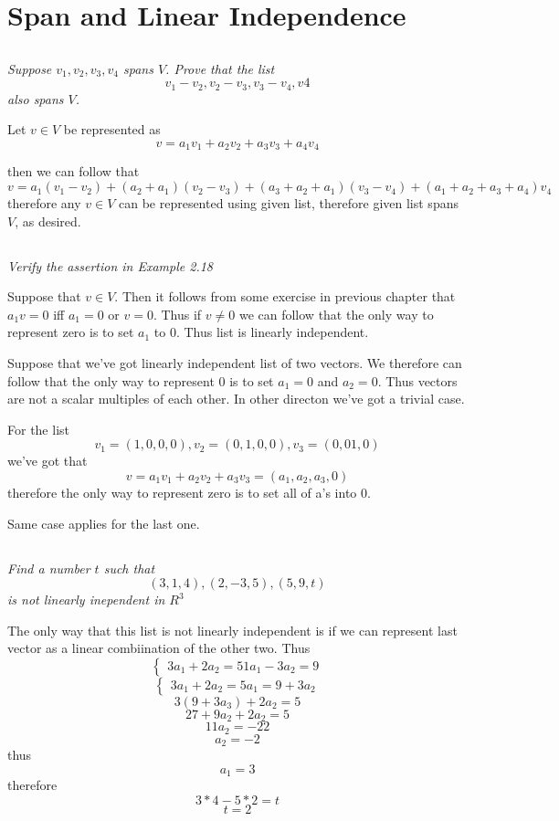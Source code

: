\documentclass[11pt,oneside,titlepage]{book}
\begin{document}
\section{Span and Linear Independence}

\subsection{}
\textit{Suppose $v_1, v_2, v_3, v_4$ spans $V$. Prove that the list }
$$v_1 - v_2, v_2 - v_3, v_3 - v_4, v4$$
\textit{also spans $V$.}

Let $v \in V$ be represented as
$$v = a_1 v_1 + a_2 v_2 + a_3 v_3 + a_4 v_4$$

then we can follow that
$$v = a_1 (v_1 - v_2) + (a_2 + a_1) (v_2 - v_3)+ (a_3 + a_2 + a_1) (v_3 - v_4) + (a_1 + a_2 + a_3 + a_4) v_4$$
therefore any $v \in V$ can be represented using given list, therefore
given list spans $V$, as desired.

\subsection{}
\textit{Verify the assertion in Example 2.18}

Suppose that $v \in V$. Then it follows from some exercise in previous
chapter that $a_1 v = 0$ iff $a_1 = 0$ or $v = 0$. Thus if $v \neq 0$ we
can follow that the only way to represent zero is to set $a_1$ to 0. Thus
list is linearly independent.


Suppose that we've got linearly independent list of two vectors. We therefore
can follow that the only way to represent 0 is to set
$a_1 = 0$ and $a_2 = 0$. Thus vectors are not a scalar multiples of each other.
In other directon we've got a trivial case.

For the list
$$v_1 = (1, 0, 0, 0), v_2 = (0, 1, 0, 0), v_3 = (0, 0 1, 0)$$
we've got that
$$v = a_1 v_1 + a_2 v_2 + a_3 v_3 = (a_1, a_2, a_3, 0)$$
therefore the only way to represent zero is to set all of a's into 0.

Same case applies for the last one.

\subsection{}
\textit{Find a number $t$ such that}
$$(3, 1, 4), (2, -3, 5), (5, 9, t)$$
\textit{is not linearly inependent in $R^3$}

The only way that this list is not linearly independent is if 
we can represent last vector as a linear combiination of the other two. Thus
$$
\begin{cases}
  3 a_1 + 2 a_2 = 5
  1 a_1 - 3 a_2 = 9
\end{cases}
$$
$$
\begin{cases}
  3 a_1 + 2 a_2 = 5
  a_1= 9 +  3 a_2
\end{cases}
$$
$$   3 (9 +  3 a_3) + 2 a_2 = 5 $$
$$   27 +  9 a_2 + 2 a_2 = 5 $$
$$ 11 a_2= -22$$
$$ a_2 = -2$$
thus
$$a_1 = 3$$
therefore
$$3 * 4 - 5 * 2 = t$$
$$t = 2$$
\end{document}
